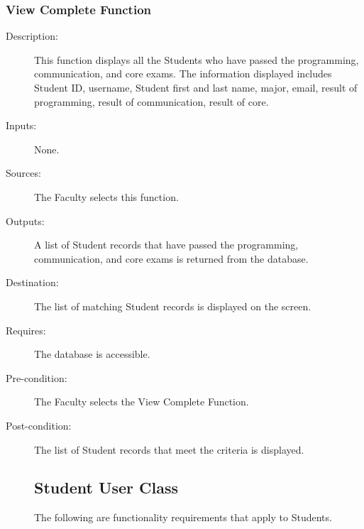 \subsubsection{\large View Complete Function}  
\begin{boxed} %
\begin{description}
\item[Description:]
   This function displays all the Students who have passed the programming,
   communication, and core exams. The information displayed includes Student ID,
   username, Student first and last name, major, email, result of programming,
   result of communication, result of core.
\item[Inputs:]
   None.
\item[Sources:]
   The Faculty selects this function.
\item[Outputs:]
   A list of Student records that have passed the programming,
   communication, and core exams is returned from the database.
\item[Destination:]
   The list of matching Student records is displayed on the screen.
\item[Requires:]
   The database is accessible.
\item[Pre-condition:]
   The Faculty selects the View Complete Function.
\item[Post-condition:]
   The list of Student records that meet the criteria is displayed.

\subsection{Student User Class}
The following are functionality requirements that apply to Students.

\end{description}
\end{boxed}
